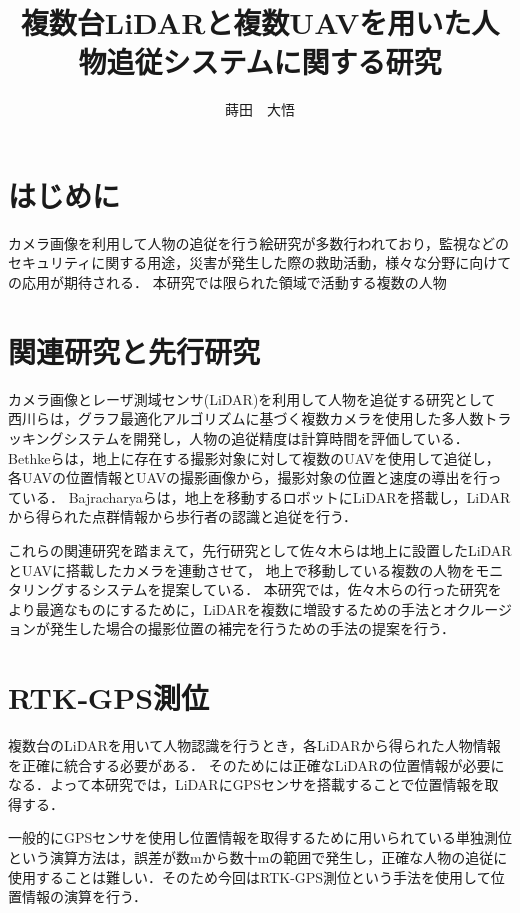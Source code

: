 \documentclass[autodetect-engine,dvipdfmx-if-dvi,ja=standard,a4j,jbase=10.5pt,twoside,twocolumn,magstyle=nomag*]{bxjsarticle}
\title{複数台LiDARと複数UAVを用いた人物追従システムに関する研究}
\author{蒔田　大悟}
\date{}
\begin{document}
\maketitle

\section{はじめに} \label{sec:intro}
カメラ画像を利用して人物の追従を行う絵研究が多数行われており，監視などのセキュリティに関する用途，災害が発生した際の救助活動，様々な分野に向けての応用が期待される．
本研究では限られた領域で活動する複数の人物%

\section{関連研究と先行研究} 
カメラ画像とレーザ測域センサ(LiDAR)を利用して人物を追従する研究として
西川らは，グラフ最適化アルゴリズムに基づく複数カメラを使用した多人数トラッキングシステムを開発し，人物の追従精度は計算時間を評価している．
Bethkeらは，地上に存在する撮影対象に対して複数のUAVを使用して追従し，各UAVの位置情報とUAVの撮影画像から，撮影対象の位置と速度の導出を行っている．\cite{bethke_2007}
Bajracharyaらは，地上を移動するロボットにLiDARを搭載し，LiDARから得られた点群情報から歩行者の認識と追従を行う．\cite{bajracharya_2009}

これらの関連研究を踏まえて，先行研究として佐々木らは地上に設置したLiDARとUAVに搭載したカメラを連動させて，
地上で移動している複数の人物をモニタリングするシステムを提案している．\cite{sasaki_2019}
本研究では，佐々木らの行った研究をより最適なものにするために，LiDARを複数に増設するための手法とオクルージョンが発生した場合の撮影位置の補完を行うための手法の提案を行う．


\section{RTK‐GPS測位}
複数台のLiDARを用いて人物認識を行うとき，各LiDARから得られた人物情報を正確に統合する必要がある．
そのためには正確なLiDARの位置情報が必要になる．よって本研究では，LiDARにGPSセンサを搭載することで位置情報を取得する．

一般的にGPSセンサを使用し位置情報を取得するために用いられている単独測位という演算方法は，誤差が数mから数十mの範囲で発生し，正確な人物の追従に使用することは難しい．そのため今回はRTK-GPS測位という手法を使用して位置情報の演算を行う．
\end{document}
